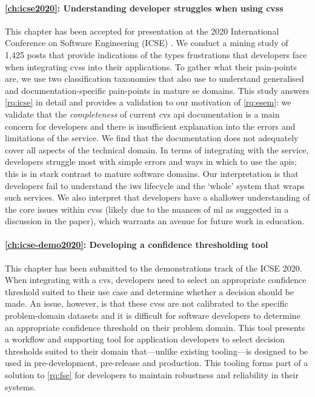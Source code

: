 \paragraph{\cref{ch:icse2020}: Understanding developer struggles when using \glspl{cvs}} This chapter has been accepted for presentation at the 2020 International Conference on Software Engineering (ICSE) \citep{Cummaudo:2019vi}. We conduct a mining study of 1,425  posts that provide indications of the types frustrations that developers face when integrating \glspl{cvs} into their applications. To gather what their pain-points are, we use two classification taxonomies that also use  to understand generalised and documentation-specific pain-points in mature \gls{se} domains. This study answers \ref{rq:icse} in detail and provides a validation to our motivation of \ref{rq:esem}: we validate that the \textit{completeness} of current \gls{cvs} \gls{api} documentation is a main concern for developers and there is insufficient explanation into the errors and limitations of the service. We find that the documentation does not adequately cover all aspects of the technical domain. In terms of integrating with the service, developers struggle most with simple errors and ways in which to use the \glspl{api}; this is in stark contrast to mature software domains. Our interpretation is that developers fail to understand the \gls{iws} lifecycle and the `whole' system that wraps such services. We also interpret that developers have a shallower understanding of the core issues within \glspl{cvs} (likely due to the nuances of \gls{ml} as suggested in a discussion in the paper), which warrants an avenue for future work in  education.

\paragraph{\cref{ch:icse-demo2020}: Developing a confidence thresholding tool} This chapter has been submitted to the demonstrations track of the ICSE 2020. When integrating with a \gls{cvs}, developers need to select an appropriate confidence threshold suited to their use case and determine whether a decision should be made. An issue, however, is that these \glspl{cvs} are not calibrated to the specific problem-domain datasets and it is difficult for software developers to determine an appropriate confidence threshold on their problem domain. This tool presents a workflow and supporting tool for application developers to select decision thresholds suited to their domain that---unlike existing tooling---is designed to be used in pre-development, pre-release and production. This tooling forms part of a solution to \ref{rq:fse} for developers to maintain robustness and reliability in their systems.

